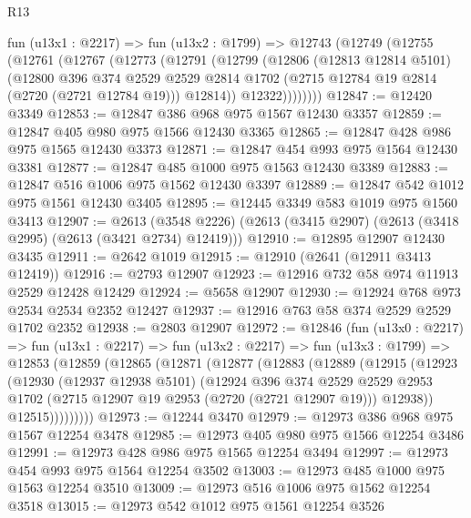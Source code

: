 \begin{lexlean}{R13}
\begin{coremodule}
    fun (u13x1 : @2217) =>
    fun (u13x2 : @1799) =>
    @12743
      (@12749
        (@12755
          (@12761
            (@12767
              (@12773
                (@12791
                  (@12799
                    (@12806
                      (@12813 @12814 @5101)
                      (@12800
                        @396
                        @374
                        @2529
                        @2529
                        @2814
                        @1702
                        (@2715 @12784 @19 @2814 (@2720 (@2721 @12784 @19)))
                        @12814))
                    @12322))))))))
@12847 := @12420 @3349
@12853 := @12847 @386 @968 @975 @1567 @12430 @3357
@12859 := @12847 @405 @980 @975 @1566 @12430 @3365
@12865 := @12847 @428 @986 @975 @1565 @12430 @3373
@12871 := @12847 @454 @993 @975 @1564 @12430 @3381
@12877 := @12847 @485 @1000 @975 @1563 @12430 @3389
@12883 := @12847 @516 @1006 @975 @1562 @12430 @3397
@12889 := @12847 @542 @1012 @975 @1561 @12430 @3405
@12895 := @12445 @3349 @583 @1019 @975 @1560 @3413
@12907 := @2613
    (@3548 @2226)
    (@2613 (@3415 @2907) (@2613 (@3418 @2995) (@2613 (@3421 @2734) @12419)))
@12910 := @12895 @12907 @12430 @3435
@12911 := @2642 @1019
@12915 := @12910 (@2641 (@12911 @3413 @12419))
@12916 := @2793 @12907
@12923 := @12916 @732 @58 @974 @11913 @2529 @12428 @12429
@12924 := @5658 @12907
@12930 := @12924 @768 @973 @2534 @2534 @2352 @12427
@12937 := @12916 @763 @58 @374 @2529 @2529 @1702 @2352
@12938 := @2803 @12907
@12972 := @12846
    (fun (u13x0 : @2217) =>
    fun (u13x1 : @2217) =>
    fun (u13x2 : @2217) =>
    fun (u13x3 : @1799) =>
    @12853
      (@12859
        (@12865
          (@12871
            (@12877
              (@12883
                (@12889
                  (@12915
                    (@12923
                      (@12930
                        (@12937 @12938 @5101)
                        (@12924
                          @396
                          @374
                          @2529
                          @2529
                          @2953
                          @1702
                          (@2715 @12907 @19 @2953 (@2720 (@2721 @12907 @19)))
                          @12938))
                      @12515)))))))))
@12973 := @12244 @3470
@12979 := @12973 @386 @968 @975 @1567 @12254 @3478
@12985 := @12973 @405 @980 @975 @1566 @12254 @3486
@12991 := @12973 @428 @986 @975 @1565 @12254 @3494
@12997 := @12973 @454 @993 @975 @1564 @12254 @3502
@13003 := @12973 @485 @1000 @975 @1563 @12254 @3510
@13009 := @12973 @516 @1006 @975 @1562 @12254 @3518
@13015 := @12973 @542 @1012 @975 @1561 @12254 @3526

\end{coremodule}
\end{lexlean}
